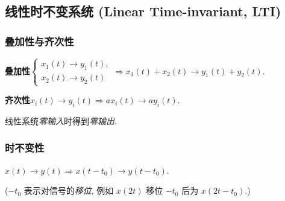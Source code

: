 \subsection{线性时不变系统 (Linear Time-invariant, LTI)}

\subsubsection{叠加性与齐次性}

\textbf{叠加性}\quad $\begin{cases}
        x_1(t)\rightarrow y_1(t), \\
        x_2(t)\rightarrow y_2(t)
    \end{cases}\Rightarrow x_1(t)+x_2(t)\rightarrow y_1(t)+y_2(t)$.

\textbf{齐次性}\quad $x_i(t)\rightarrow y_i(t)\Rightarrow ax_i(t)\rightarrow ay_i(t)$.

线性系统\textit{零输入}时得到\textit{零输出}.

\subsubsection{时不变性}

$x(t)\rightarrow y(t)\Rightarrow x(t-t_0)\rightarrow y(t-t_0)$.

($-t_0$ 表示对信号的\textit{移位}, 例如 $x(2t)$ 移位 $-t_0$ 后为 $x(2t-t_0)$.)

